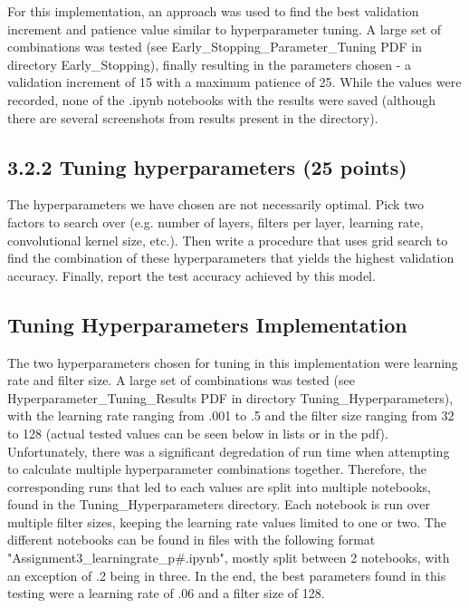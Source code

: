 \documentclass[11pt]{article}
\begin{document}
For this implementation, an approach was used to find the best
validation increment and patience value similar to hyperparameter
tuning. A large set of combinations was tested (see
Early\_Stopping\_Parameter\_Tuning PDF in directory Early\_Stopping),
finally resulting in the parameters chosen - a validation increment of
15 with a maximum patience of 25. While the values were recorded, none
of the .ipynb notebooks with the results were saved (although there are
several screenshots from results present in the directory).

\subsection{3.2.2 Tuning hyperparameters (25
points)}\label{tuning-hyperparameters-25-points}

The hyperparameters we have chosen are not necessarily optimal. Pick two
factors to search over (e.g. number of layers, filters per layer,
learning rate, convolutional kernel size, etc.). Then write a procedure
that uses grid search to find the combination of these hyperparameters
that yields the highest validation accuracy. Finally, report the test
accuracy achieved by this model.

\subsection{Tuning Hyperparameters
Implementation}\label{tuning-hyperparameters-implementation}

The two hyperparameters chosen for tuning in this implementation were
learning rate and filter size. A large set of combinations was tested
(see Hyperparameter\_Tuning\_Results PDF in directory
Tuning\_Hyperparameters), with the learning rate ranging from .001 to .5
and the filter size ranging from 32 to 128 (actual tested values can be
seen below in lists or in the pdf). Unfortunately, there was a
significant degredation of run time when attempting to calculate
multiple hyperparameter combinations together. Therefore, the
corresponding runs that led to each values are split into multiple
notebooks, found in the Tuning\_Hyperparameters directory. Each notebook
is run over multiple filter sizes, keeping the learning rate values
limited to one or two. The different notebooks can be found in files
with the following format "Assignment3\_learningrate\_p\#.ipynb", mostly
split between 2 notebooks, with an exception of .2 being in three. In
the end, the best parameters found in this testing were a learning rate
of .06 and a filter size of 128.
\end{document}
